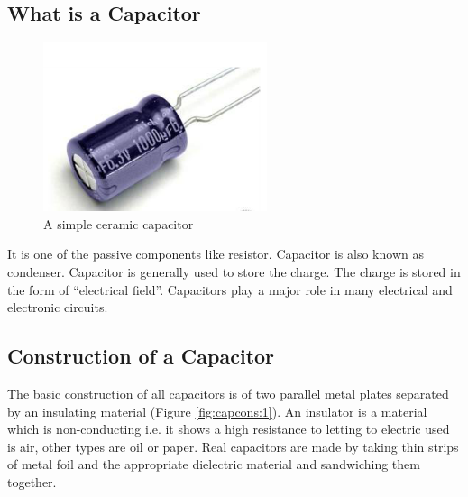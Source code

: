 	\subsection{What is a Capacitor}		
		\begin{figure}[h!]
			\centering
			\includegraphics[width=0.7\linewidth]{img/exp2/1}
			\caption[]{A simple ceramic capacitor}
			\label{fig:cap1}
		\end{figure}
		It is one of the passive components like resistor. Capacitor is also known as condenser. Capacitor is generally used to store the charge. The charge is stored in the form of “electrical field”. Capacitors play a major role in many electrical and electronic circuits.
	
	\subsection{Construction of a Capacitor}
		The basic construction of all capacitors is of two parallel metal plates separated by an insulating material (Figure \ref{fig:capcons:1}). An insulator is a material which is non-conducting i.e. it shows a high resistance to letting to electric used is air, other types are oil or paper. Real capacitors are made by taking thin strips of metal foil and the appropriate dielectric material and sandwiching them together.
		
